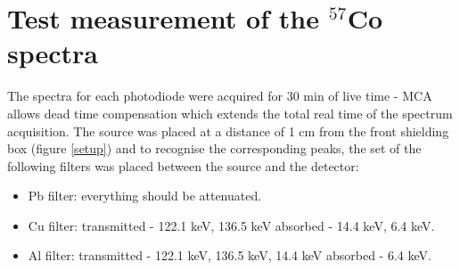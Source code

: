 \section{Test measurement of the $^{57}$Co spectra}
The spectra for each photodiode were acquired for 30 min of live time - MCA allows dead time compensation which extends the total real time of the spectrum acquisition. The source was placed at a distance of 1 cm from the front shielding box (figure \ref{setup}) and to recognise the corresponding peaks, the set of the following filters was placed between the source and the detector:
\begin{itemize}
\item Pb filter: everything should be attenuated.
\item Cu filter: transmitted - 122.1 keV, 136.5 keV absorbed - 14.4 keV, 6.4 keV.
\item Al filter: transmitted - 122.1 keV, 136.5 keV, 14.4 keV absorbed - 6.4 keV.
\end{itemize}



